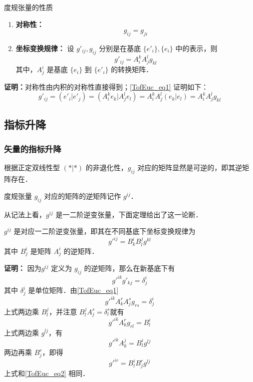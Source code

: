 \begin{theorem}{度规张量的性质}
\begin{enumerate}
\item \textbf{对称性：}\begin{equation}
g_{ij}=g_{ji}
\end{equation}
\item \textbf{坐标变换规律：} 设 $g'_{ij},g_{ij}$ 分别是在基底 $\{e'_i\},\{e_i\}$ 中的表示，则
\begin{equation}\label{TofEuc_eq1}
g'_{ij}=A^k_{i} A^l_{j}g_{kl}
\end{equation}
其中，$A^i_j$ 是基底 $\{e_i\}$ 到 $\{e'_i\}$ 的转换矩阵．
\end{enumerate}
\end{theorem}
\textbf{证明：}对称性由内积的对称性直接得到；\autoref{TofEuc_eq1} 证明如下：
\begin{equation}
g'_{ij}=(e'_i|e'_j)=(A^k_i e_k|A^l_j e_l)=A^k_{i} A^l_{j}(e_k|e_l)=A^k_{i} A^l_{j}g_{kl}
\end{equation}

\subsection{指标升降}
\subsubsection{矢量的指标升降}
根据正定双线性型 $(*|*)$ 的非退化性，$g_{ij}$ 对应的矩阵显然是可逆的，即其逆矩阵存在．
\begin{definition}{}
度规张量 $g_{ij}$ 对应的矩阵的逆矩阵记作 $g^{ij}$．
\end{definition}
从记法上看，$g^{ij}$ 是一二阶逆变张量，下面定理给出了这一论断．
\begin{theorem}{}
$g^{ij}$ 是对应一二阶逆变张量，即其在不同基底下坐标变换规律为
\begin{equation}\label{TofEuc_eq2}
g'^{ij}=B^i_kB^j_l g^{kl}
\end{equation}
其中 $B^i_j$ 是矩阵 $A^i_j$ 的逆矩阵．
\end{theorem} 

\textbf{证明：}
因为$g^{ij}$ 定义为 $g_{ij}$ 的逆矩阵，那么在新基底下有 \begin{equation}
g'^{ik}g'_{kj}=\delta^i_j
\end{equation}
其中 $\delta^i_j$ 是单位矩阵．由\autoref{TofEuc_eq1} 
\begin{equation}
g'^{ik}A^r_k A^s_j g_{rs}=\delta^i_j
\end{equation}
上式两边乘 $B^j_l$，并注意 $B^j_lA^s_j=\delta^s_l$就有
\begin{equation}
g'^{ik}A^r_k g_{rl}=B^
i_l
\end{equation}
上式两边乘 $g^{lj}$，有
\begin{equation}
g'^{ik}A^j_k=B^i_lg^{lj}
\end{equation}
两边再乘 $B^r_j$，即得
\begin{equation}
g'^{ir}=B^i_lB^r_jg^{lj}
\end{equation}
上式和\autoref{TofEuc_eq2} 相同．

